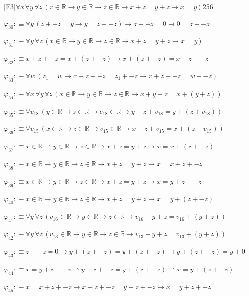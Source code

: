 \begin{fullproof}{[F3]}{$\forall x\,\forall y\,\forall z\,(x \in \mathbb{R} \to y \in \mathbb{R} \to z \in \mathbb{R} \to x + z = y + z \to x = y)$}{256}
\begin{abbrevlist}
\item $\varphi_{30} :\equiv \forall y\,(z + -z = y \to y = z + -z) \to z + -z = 0 \to 0 = z + -z$
\item $\varphi_{31} :\equiv \forall y\,\forall z\,(x \in \mathbb{R} \to y \in \mathbb{R} \to z \in \mathbb{R} \to x + z = y + z \to x = y)$
\item $\varphi_{32} :\equiv x + z + -z = x + (z + -z) \to x + (z + -z) = x + z + -z$
\item $\varphi_{33} :\equiv \forall w\,(z_{1} = w \to x + z + -z = z_{1} + -z \to x + z + -z = w + -z)$
\item $\varphi_{34} :\equiv \forall x\,\forall y\,\forall z\,(x \in \mathbb{R} \to y \in \mathbb{R} \to z \in \mathbb{R} \to x + y + z = x + (y + z))$
\item $\varphi_{35} :\equiv \forall v_{18}\,(y \in \mathbb{R} \to z \in \mathbb{R} \to v_{18} \in \mathbb{R} \to y + z + v_{18} = y + (z + v_{18}))$
\item $\varphi_{36} :\equiv \forall v_{15}\,(x \in \mathbb{R} \to z \in \mathbb{R} \to v_{15} \in \mathbb{R} \to x + z + v_{15} = x + (z + v_{15}))$
\item $\varphi_{37} :\equiv x \in \mathbb{R} \to y \in \mathbb{R} \to z \in \mathbb{R} \to x + z = y + z \to x = x + (z + -z)$
\item $\varphi_{38} :\equiv x \in \mathbb{R} \to y \in \mathbb{R} \to z \in \mathbb{R} \to x + z = y + z \to x = x + z + -z$
\item $\varphi_{39} :\equiv x \in \mathbb{R} \to y \in \mathbb{R} \to z \in \mathbb{R} \to x + z = y + z \to x = y + z + -z$
\item $\varphi_{40} :\equiv x \in \mathbb{R} \to y \in \mathbb{R} \to z \in \mathbb{R} \to x + z = y + z \to x = y + (z + -z)$
\item $\varphi_{41} :\equiv \forall y\,\forall z\,(v_{16} \in \mathbb{R} \to y \in \mathbb{R} \to z \in \mathbb{R} \to v_{16} + y + z = v_{16} + (y + z))$
\item $\varphi_{42} :\equiv \forall y\,\forall z\,(v_{13} \in \mathbb{R} \to y \in \mathbb{R} \to z \in \mathbb{R} \to v_{13} + y + z = v_{13} + (y + z))$
\item $\varphi_{43} :\equiv z + -z = 0 \to y + (z + -z) = y + (z + -z) \to y + (z + -z) = y + 0$
\item $\varphi_{44} :\equiv x = y + z + -z \to y + z + -z = y + (z + -z) \to x = y + (z + -z)$
\item $\varphi_{45} :\equiv x = x + z + -z \to x + z + -z = y + z + -z \to x = y + z + -z$

\end{abbrevlist}
\end{fullproof}
